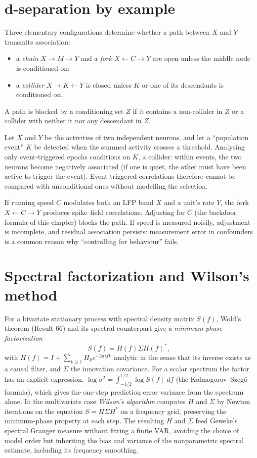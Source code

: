 \section{d-separation by example}
Three elementary configurations determine whether a path between $X$
and $Y$ transmits association:
\begin{itemize}[leftmargin=2em]
\item a \emph{chain} $X\to M\to Y$ and a \emph{fork} $X\leftarrow C\to Y$
are open unless the middle node is conditioned on;
\item a \emph{collider} $X\to K\leftarrow Y$ is closed unless $K$ or one of
its descendants is conditioned on.
\end{itemize}
A path is blocked by a conditioning set $Z$ if it contains a non-collider
in $Z$ or a collider with neither it nor any descendant in $Z$.
\begin{example}
Let $X$ and $Y$ be the activities of two independent neurons, and let a
``population event'' $K$ be detected when the summed activity crosses a
threshold. Analysing only event-triggered epochs conditions on $K$, a
collider: within events, the two neurons become negatively associated
(if one is quiet, the other must have been active to trigger the event).
Event-triggered correlations therefore cannot be compared with
unconditional ones without modelling the selection.
\end{example}
\begin{example}
If running speed $C$ modulates both an LFP band $X$ and a unit's rate $Y$,
the fork $X\leftarrow C\to Y$ produces spike--field correlations.
Adjusting for $C$ (the backdoor formula of this chapter) blocks the
path. If speed is measured noisily, adjustment is incomplete, and
residual association persists: measurement error in confounders is a
common reason why ``controlling for behaviour'' fails.
\end{example}

\section{Spectral factorization and Wilson's method}
For a bivariate stationary process with spectral density matrix $S(f)$,
Wold's theorem (Result 66) and its spectral counterpart give a
\emph{minimum-phase factorization}
\[
S(f)=H(f)\Sigma H(f)^\ast,
\]
with $H(f)=I+\sum_{k\ge1}H_ke^{-2\pi ifk}$ analytic in the sense that
its inverse exists as a causal filter, and $\Sigma$ the innovation
covariance. For a scalar spectrum the factor has an explicit expression,
$\log\sigma^2=\int_{-1/2}^{1/2}\log S(f)\,df$ (the Kolmogorov--Szeg\H{o}
formula), which gives the one-step prediction error variance from the
spectrum alone. In the multivariate case \emph{Wilson's algorithm}
computes $H$ and $\Sigma$ by Newton iterations on the equation
$S=H\Sigma H^\ast$ on a frequency grid, preserving the minimum-phase
property at each step. The resulting $H$ and $\Sigma$ feed Geweke's
spectral Granger measure without fitting a finite VAR, avoiding the
choice of model order but inheriting the bias and variance of the
nonparametric spectral estimate, including its frequency smoothing.

